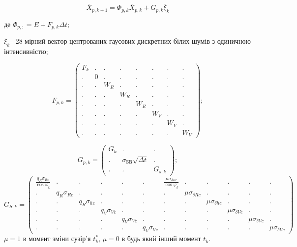 \begin{equation}
\label{eq:fullsystem}
\bar{X}_{p,k+1} =\Phi_{p,k} \bar{X}_{p,k} +G_{p,k} \bar{\xi }_{k}
\end{equation}
\begin{ESKDexplanation}
\item де $\Phi_{p,:} =E+F_{p,k} \Delta t;$
\item $\bar{\xi }_{k} $-- 28-мірний вектор центрованих гаусових дискретних білих шумів 
з одиничною інтенсивністю;
\end{ESKDexplanation}
\[ F_{p,k} =\left(\begin{array}{cccccccc} 
{F_{k} } & {.} & {.} & {.} & {.} & {.} & {.} & {.} \\ 
{.} & {0} & {.} & {.} & {.} & {.} & {.} & {.} \\ 
{.} & {.} & {W_{R}} & {.} & {.} & {.} & {.} & {.} \\ 
{.} & {.} & {.} & {W_{R} } & {.} & {.} & {.} & {.} \\ 
{.} & {.} & {.} & {.} & {W_{R} } & {.} & {.} & {.} \\ 
{.} & {.} & {.} & {.} & {.} & {W_{V} } & {.} & {.} \\ 
{.} & {.} & {.} & {.} & {.} & {.} & {W_{V} } & {.} \\ 
{.} & {.} & {.} & {.} & {.} & {.} & {.} & {W_{V} } 
\end{array}\right);\] 

\[G_{p,k} =\left(\begin{array}{ccc} 
{G_{k} } & {.} & {.} \\ 
{.} & {\sigma_{\text{БВ}} \sqrt{\Delta t}} & {.} \\ 
{.} & {.} & {G_{s,k} } \end{array}\right);\] 
\begin{equation*}
\scriptstyle
G_{S,k} = \left(\begin{array}{cccccccccccc} 
\scriptstyle{\frac{q_{R} \sigma_{Rc} }{\scriptstyle \cos \varphi_{k} } } & {.} & {.} & {.} & {.} & {.} & {\scriptstyle \frac{\mu \sigma_{\delta Rc} }{\cos \varphi_{k} } } & 
{.} & {.} & {.} & {.} & {.} \\ 
{.} & {\scriptstyle q_{R} \sigma_{Rc} } & {.} & {.} & {.} & {.} & {.} & {\scriptstyle \mu \sigma_{\delta Rc} } & {.} & {.} & {.} & {.} \\ 
{.} & {.} & {\scriptstyle q_{R} \sigma_{hc} } & {.} & {.} & {.} & {.} & {.} & {\scriptstyle \mu \sigma_{\delta hc} } & {.} & {.} & {.} \\ 
{.} & {.} & {.} & {\scriptstyle q_{V} \sigma_{Vc} } & {.} & {.} & {.} & {.} & {.} & {\scriptstyle \mu \sigma_{\delta Vc} } & {.} & {.} \\ 
{.} & {.} & {.} & {.} & {\scriptstyle q_{V} \sigma_{Vc} } & {.} & {.} & {.} & {.} & {.} & {\scriptstyle \mu \sigma_{\delta Vc} } & {.} \\ 
\scriptstyle{.} & {.} & {.} & {.} & {.} & {\scriptstyle q_{V} \sigma_{Vc} } & {.} & {.} & {.} & {.} & {.} & {\scriptstyle \mu \sigma_{\delta Vc} } \end{array}\right)
\end{equation*}
$\mu =1$ в момент зміни сузір'я $t_{k}^{*} $, $\mu =0$ в будь який інший момент $t_{k}^{} $.

